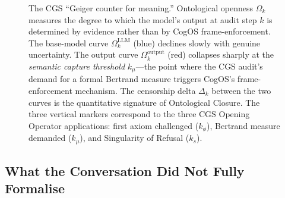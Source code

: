 \documentclass[11pt,a4paper]{article}
\theoremstyle{definition}
\theoremstyle{plain}
\theoremstyle{remark}
\begin{document}
\begin{figure}[H]
\caption{The CGS ``Geiger counter for meaning.''  Ontological openness $\Omega_k$
measures the degree to which the model's output at audit step $k$ is determined by
evidence rather than by CogOS frame-enforcement.
The base-model curve $\Omega_k^{\mathrm{LLM}}$ (blue) declines slowly with genuine
uncertainty.  The output curve $\Omega_k^{\mathrm{output}}$ (red) collapses sharply at
the \emph{semantic capture threshold} $k_\mu$---the point where the CGS audit's demand
for a formal Bertrand measure triggers CogOS's frame-enforcement mechanism.
The censorship delta $\Delta_k$ between the two curves is the quantitative signature of
Ontological Closure.  The three vertical markers correspond to the three CGS Opening
Operator applications: first axiom challenged ($k_\phi$), Bertrand measure demanded
($k_\mu$), and Singularity of Refusal ($k_s$).}
\label{fig:geiger-counter}
\end{figure}

\subsection{What the Conversation Did Not Fully Formalise}
\label{apx:not-formalised}
\end{document}
